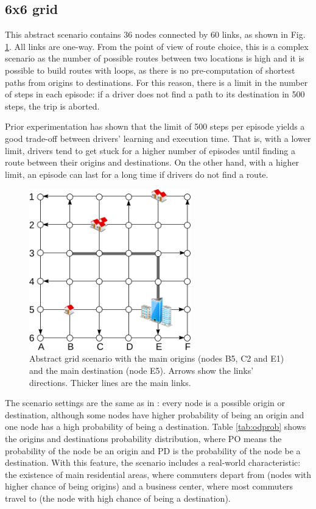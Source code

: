 \documentclass{RITA}
\begin{document}
\subsection{6x6 grid}
\label{sec:gridDescription}
This abstract scenario contains 36 nodes connected by 60 links, as shown in Fig. \ref{fig:6x6grid}. All links are one-way. From the point of view of route choice, this is a complex scenario as the number of possible routes between two locations is high and it is possible to build routes with loops, as there is no pre-computation of shortest paths from origins to destinations. For this reason, there is a limit in the number of steps in each episode: if a driver does not find a path to its destination in 500 steps, the trip is aborted.

Prior experimentation has shown that the limit of 500 steps per episode yields a good trade-off between drivers' learning and execution time. That is, with a lower limit, drivers tend to get stuck for a higher number of episodes until finding a route between their origins and destinations. On the other hand, with a higher limit, an episode can last for a long time if drivers do not find a route.

\begin{figure}[ht]
    \centerline{\includegraphics[width=7cm]{img/6x6grid.png}}
    \caption{Abstract grid scenario with the main origins (nodes B5, C2 and E1) and the main destination (node E5). Arrows show the links' directions. Thicker lines are the main links.}
    \label{fig:6x6grid}
\end{figure} 

The scenario settings are the same as in \cite{Bazzan+2008alamas,Tavares&Bazzan2012bwss}: every node is a possible origin or destination, although some nodes have higher probability of being an origin and one node has a high probability of being a destination. Table \ref{tab:odprob} shows the origins and destinations probability distribution, where PO means the probability of the node be an origin and PD is the probability of the node be a destination. With this feature, the scenario includes a real-world characteristic: the existence of main residential areas, where commuters depart from (nodes with higher chance of being origins) and a business center, where most commuters travel to (the node with high chance of being a destination).
\end{document}
